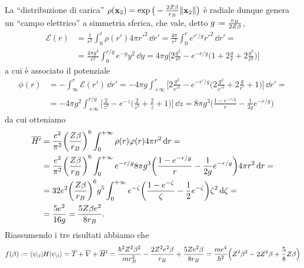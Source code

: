 La ``distribuzione di carica'' $\rho(\mathbf{x}_2)=\exp\big(-\frac{2Z\beta}{r_B}\lVert\mathbf{x}_2\rVert\big)$ è radiale dunque genera un ``campo elettrico'' a simmetria sferica, che vale, detto $g\defeq\frac{r_B}{2Z\beta}$,
\begin{equation}
    \begin{split}
        \mathcal E(r)&=
        \frac1{r^2}\int_0^r\rho(r')4\pi r'^2\,\dd r'=
        \frac{4\pi}{r^2}\int_0^re^{r'/g}r'^2\,\dd r'=\\&=
        \frac{4\pi g^3}{r^2}\int_0^{r/g}e^{-y}y^2\,\dd y=4\pi g\biggl[2\frac{g^2}{r^2}-e^{-r/g}\biggl(1+2\frac{g}{r}+2\frac{g^2}{r^2}\biggr)\biggr]
    \end{split}
\end{equation}
a cui è associato il potenziale
\begin{equation}
    \begin{split}
        \phi(r)&=
        -\int_{\infty}^r\mathcal E(r')\,\dd r'=
        -4\pi g\int_{+\infty}^r\biggl[2\frac{g^2}{r'^2}-e^{-r'/g}\biggl(2\frac{g^2}{r'^2}+2\frac{g}{r'}+1\biggr)\biggr]\,\dd r'=\\&=
        -4\pi g^2\int_{+\infty}^{r/g}\biggl[\frac2{z^2}-e^{-z}\biggl(\frac2{z^2}+\frac2{z}+1\biggr)\biggr]\,\dd z=
        8\pi g^3\biggl(\frac{1-e^{-r/g}}{r}-\frac1{2g}e^{-r/g}\biggr)
    \end{split}
\end{equation}
da cui otteniamo
\begin{equation}
    \begin{split}
        \overline{H'}&=
        \frac{e^2}{\pi^2}\biggl(\frac{Z\beta}{r_B}\biggr)^6\int_0^{+\infty}\rho(r)\varphi(r)4\pi r^2\,\textup{d} r=\\&=
        \frac{e^2}{\pi^2}\biggl(\frac{Z\beta}{r_B}\biggr)^6\int_0^{+\infty}e^{-r/g}8\pi g^3\biggr(\frac{1-e^{-r/g}}{r}-\frac1{2g}e^{-r/g}\biggr)4\pi r^2\,\textup{d} r=\\&=
        32e^2\biggl(\frac{Z\beta}{r_B}\biggr)^6g^5\int_0^{+\infty}e^{-\zeta}\biggl(\frac{1-e^{-\zeta}}{\zeta}-\frac12e^{-\zeta}\biggr)\zeta^2\,\textup{d}\zeta=\\&=
        \frac{5e^2}{16g}=
        \frac{5Z\beta e^2}{8r_B}.
    \end{split}
\end{equation}
Riassumendo i tre risultati abbiamo che
\begin{equation}
    f(\beta)\defeq
    \bra{\psi_\beta}H\ket{\psi_\beta}=
    \avg{T}+\avg{V}+\avg{H'}=
    \frac{\hbar^2Z^2\beta^2}{mr_B^2}-\frac{2Z^2e^2\beta}{r_B}+\frac{5Ze^2\beta}{8r_B}=
    \frac{me^4}{\hbar^2}\Bigl(Z^2\beta^2-2Z^2\beta+\frac58Z\beta\Bigr)
\end{equation}
